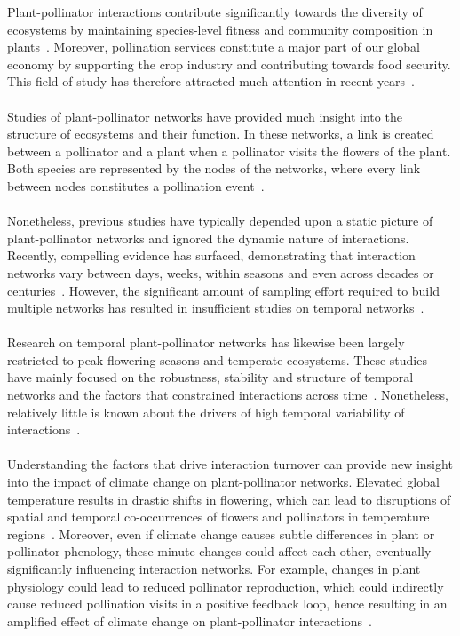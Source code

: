 \documentclass[11pt]{article}
\begin{document}
Plant-pollinator interactions contribute significantly towards the diversity of ecosystems by maintaining species-level fitness and community composition in plants~\citep{Olesen2008}. Moreover, pollination services constitute a major part of our global economy by supporting the crop industry and contributing towards food security. This field of study has therefore attracted much attention in recent years~\citep{Allsopp2008}. \\
\\
Studies of plant-pollinator networks have provided much insight into the structure of ecosystems and their function. In these networks, a link is created between a pollinator and a plant when a pollinator visits the flowers of the plant. Both species are represented by the nodes of the networks, where every link between nodes constitutes a pollination event~\citep{Poisot2012}. \\
\\
Nonetheless, previous studies have typically depended upon a static picture of plant-pollinator networks and ignored the dynamic nature of interactions. Recently, compelling evidence has surfaced, demonstrating that interaction networks vary between days, weeks, within seasons and even across decades or centuries~\citep{Olesen2008, Burkle2013, Yeakel2014, CaraDonna2017}. However, the significant amount of sampling effort required to build multiple networks has resulted in insufficient studies on temporal networks~\citep{Burkle2011}.\\
\\
Research on temporal plant-pollinator networks has likewise been largely restricted to peak flowering seasons and temperate ecosystems. These studies have mainly focused on the robustness, stability and structure of temporal networks and the factors that constrained interactions across time~\citep{BASILIO2006, Olesen2008, CaraDonna2017}. Nonetheless, relatively little is known about the drivers of high temporal variability of interactions~\citep{Burkle2011}.\\
\\
Understanding the factors that drive interaction turnover can provide new insight into the impact of climate change on plant-pollinator networks. Elevated global temperature results in drastic shifts in flowering, which can lead to disruptions of spatial and temporal co-occurrences of flowers and pollinators in temperature regions~\citep{Schweiger2010}. Moreover, even if climate change causes subtle differences in plant or pollinator phenology, these minute changes could affect each other, eventually significantly influencing interaction networks. For example, changes in plant physiology could lead to reduced pollinator reproduction, which could indirectly cause reduced pollination visits in a positive feedback loop, hence resulting in an amplified effect of climate change on plant-pollinator interactions~\citep{Scaven2013}. \\
\end{document}
